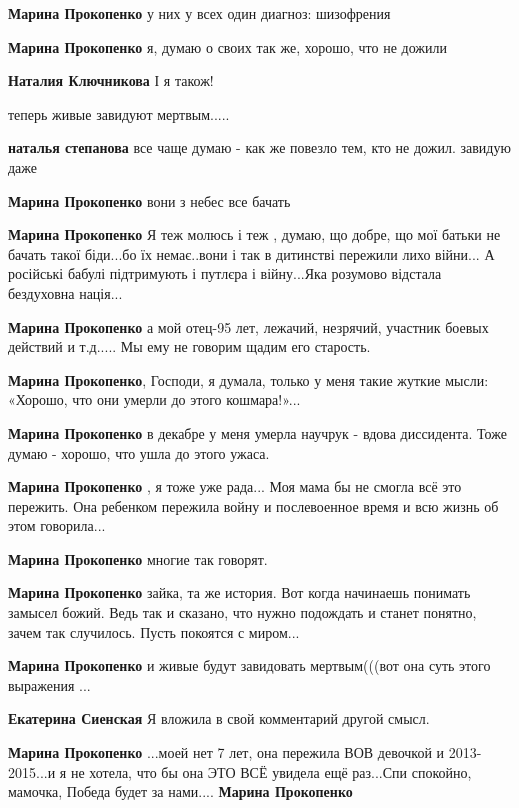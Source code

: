 \begin{itemize}
\begin{itemize}
\textbf{Марина Прокопенко} у них у всех один диагноз: шизофрения

\textbf{Марина Прокопенко} я, думаю о своих так же, хорошо, что не дожили

\textbf{Наталия Ключникова} І я також!

теперь живые завидуют мертвым.....

\textbf{наталья степанова} все чаще думаю - как же повезло тем, кто не дожил. завидую даже

\textbf{Марина Прокопенко} вони з небес все бачать

\textbf{Марина Прокопенко} Я теж молюсь і теж , думаю, що добре, що мої батьки не бачать такої біди...бо їх немає..вони і так в дитинстві пережили лихо війни...
А російські бабулі підтримують і путлєра і війну...Яка розумово відстала бездуховна нація...

\textbf{Марина Прокопенко} а мой отец-95 лет, лежачий, незрячий, участник боевых действий и т.д..... Мы ему не говорим щадим его старость.

\textbf{Марина Прокопенко}, Господи, я думала, только у меня такие жуткие мысли: «Хорошо, что они умерли до этого кошмара!»...

\textbf{Марина Прокопенко} в декабре у меня умерла научрук - вдова диссидента. Тоже думаю - хорошо, что ушла до этого ужаса.

\textbf{Марина Прокопенко} , я тоже уже рада... Моя мама бы не смогла всё это пережить. Она ребенком пережила войну и послевоенное время и всю жизнь об этом говорила...

\textbf{Марина Прокопенко} многие так говорят.

\textbf{Марина Прокопенко} зайка, та же история. Вот когда начинаешь понимать замысел божий. Ведь так и сказано, что нужно подождать и станет понятно, зачем так случилось. Пусть покоятся с миром...

\textbf{Марина Прокопенко} и живые будут завидовать мертвым(((вот она суть этого выражения ...

\textbf{Екатерина Сиенская} Я вложила в свой комментарий другой смысл.

\textbf{Марина Прокопенко} ...моей нет 7 лет, она пережила ВОВ девочкой и 2013-2015...и я не хотела, что бы она ЭТО ВСЁ увидела ещё раз...Спи спокойно, мамочка, Победа будет за нами....
\textbf{Марина Прокопенко} 


\end{itemize}
\end{itemize}
